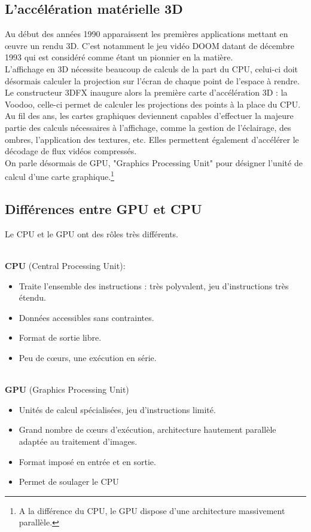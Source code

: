 \subsection{L'accélération matérielle 3D}
Au début des années 1990 apparaissent les premières applications mettant en œuvre un rendu 3D. C'est notamment le jeu vidéo DOOM datant de décembre 1993 qui est considéré comme étant un pionnier en la matière.\\
L'affichage en 3D nécessite beaucoup de calculs de la part du CPU, celui-ci doit désormais calculer la projection sur l'écran de chaque point de l'espace à rendre.\\
Le constructeur 3DFX inaugure alors la première carte d'accélération 3D : la Voodoo, celle-ci permet de calculer les projections des points à la place du CPU.\\
Au fil des ans, les cartes graphiques deviennent capables d'effectuer la majeure partie des calculs nécessaires à l'affichage,  comme la gestion de l'éclairage, des ombres, l'application des textures, etc. Elles permettent
également d'accélérer le décodage de flux vidéos compressés.\\
On parle désormais de GPU, "Graphics Processing Unit" pour désigner l'unité de calcul d'une carte graphique.\footnote{A la différence du CPU, le GPU dispose d'une architecture massivement parallèle.}

\subsection{Différences entre GPU et CPU}

Le CPU et le GPU ont des rôles très différents.

\textbf{\\CPU} (Central Processing Unit):
\begin{itemize}
	\item	Traite l'ensemble des instructions : très polyvalent, jeu d'instructions très étendu.
	\item	Données accessibles sans contraintes.
	\item	Format de sortie libre.
	\item	Peu de cœurs, une exécution en série.
\end{itemize}

\textbf{\\GPU} (Graphics Processing Unit)
\begin{itemize}
	\item	Unités de calcul spécialisées, jeu d'instructions limité.
	\item	Grand nombre de cœurs d'exécution, architecture hautement parallèle adaptée au traitement d'images.
	\item	Format imposé en entrée et en sortie.
	\item	Permet de soulager le CPU

\end{itemize}

